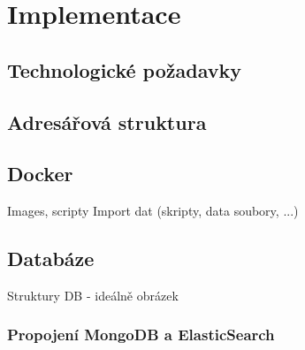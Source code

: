 \chapter{Implementace}
\section{Technologické požadavky}
\section{Adresářová struktura}
\section{Docker}
Images, scripty \newline
Import dat (skripty, data soubory, ...) 
\section{Databáze}
Struktury DB - ideálně obrázek\newline
\subsection{Propojení MongoDB a ElasticSearch}